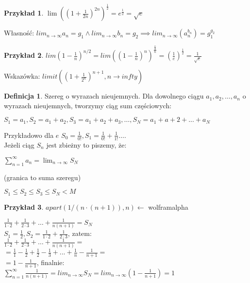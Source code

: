 \documentclass{article}
\theoremstyle{definition}
\newtheorem{de}{Definicja}[subsection]
\theoremstyle{definition}
\theoremstyle{definition}
\newtheorem{pk}{Przykład}[subsection]
\theoremstyle{definition}
\begin{document}
\begin{pk}
    $\lim ((1+\frac{1}{2n})^{2n})^{\frac{1}{2}}=e^{\frac{1}{2}}=\sqrt{e}$
\end{pk}

Własność: $lim_{n\rightarrow \infty} a_n = g_1 \land lim_{n\rightarrow \infty} b_n = g_2 \implies lim_{n\rightarrow \infty} (a_n^{b_n})=g_1^{g_2}$

\begin{pk}
    $lim (1-\frac{1}{n})^{n/2}=lim \left((1-\frac{1}{n})^n\right)^{\frac{\frac{n}{2}}{n}}=(\frac{1}{e})^{\frac{1}{2}}=\frac{1}{\sqrt{e}}$
\end{pk}

Wskazówka: $limit\left((1+\frac{1}{2^n})^{n+1},n\rightarrow infty\right)$

\begin{de}
Szereg o wyrazach nieujemnych. Dla dowolnego ciągu $a_1, a_2, \dots, a_n$ o wyrazach nieujemnych,
tworzymy ciąg sum częściowych:
\begin{center}
$S_1=a_1, S_2=a_1+a_2, S_3=a_1+a_2+a_3, \dots, S_N=a_1+a+2+...+a_N$
\end{center}

Przykładowo dla $e$ $S_0=\frac{1}{0!}, S_1=\frac{1}{0!}+\frac{1}{1!}\dots$.\\
Jeżeli ciąg $S_n$ jest zbieżny to piszemy, że:
\begin{center}
$\sum_{n=1}^{\infty} a_n = \lim_{n\rightarrow \infty} S_N$
\end{center}
(granica to suma szeregu)
\begin{center}
    $S_1\leq S_2\leq S_3\leq S_N < M$
\end{center}
\end{de}

\begin{pk}
    $apart(1/(n\cdot(n+1)),n)\leftarrow$ wolframalpha
    \begin{center}
    $\frac{1}{1\cdot 2} + \frac{1}{2\cdot 3}+ \dots + \frac{1}{n(n+1)}=S_N$\\
    $S_1=\frac{1}{2}, S_2=\frac{1}{1\cdot 2}+\frac{1}{2\cdot 3}$, zatem:\\
    $\frac{1}{1\cdot 2} + \frac{1}{2\cdot 3}+ \dots + \frac{1}{n(n+1)}=$\\
    $=\frac{1}{1} - \frac{1}{2} + \frac{1}{2} - \frac{1}{3} + ... + \frac{1}{n} - \frac{1}{n+1}=$\\
    $=1-\frac{1}{n+1}$, finalnie:\\
    $\sum_{n=1}^{\infty} \frac{1}{n(n+1)} = lim_{n\rightarrow \infty} S_N = lim_{n\rightarrow \infty} (1 - \frac{1}{n+1}) = 1$
    \end{center}
\end{pk}
\end{document}

